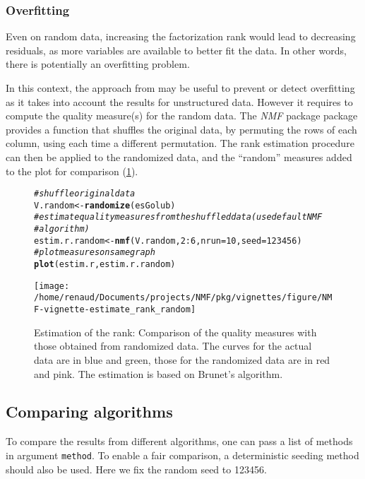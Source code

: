 \documentclass[a4paper]{article}\usepackage[]{graphicx}\usepackage[]{color}
\makeatletter
\def\maxwidth{ %
  \ifdim\Gin@nat@width>\linewidth
    \linewidth
  \else
    \Gin@nat@width
  \fi
}
\newcommand{\hlnum}[1]{\textcolor[rgb]{0.686,0.059,0.569}{#1}}%
\newcommand{\hlcom}[1]{\textcolor[rgb]{0.678,0.584,0.686}{\textit{#1}}}%
\newcommand{\hlopt}[1]{\textcolor[rgb]{0,0,0}{#1}}%
\newcommand{\hlstd}[1]{\textcolor[rgb]{0.345,0.345,0.345}{#1}}%
\newcommand{\hlkwb}[1]{\textcolor[rgb]{0.69,0.353,0.396}{#1}}%
\newcommand{\hlkwc}[1]{\textcolor[rgb]{0.333,0.667,0.333}{#1}}%
\newcommand{\hlkwd}[1]{\textcolor[rgb]{0.737,0.353,0.396}{\textbf{#1}}}%
\newenvironment{kframe}{%
 \def\at@end@of@kframe{}%
 \ifinner\ifhmode%
  \def\at@end@of@kframe{\end{minipage}}%
  \begin{minipage}{\columnwidth}%
 \fi\fi%
 \def\FrameCommand##1{\hskip\@totalleftmargin \hskip-\fboxsep
 \colorbox{shadecolor}{##1}\hskip-\fboxsep
     \hskip-\linewidth \hskip-\@totalleftmargin \hskip\columnwidth}%
 \MakeFramed {\advance\hsize-\width
   \@totalleftmargin\z@ \linewidth\hsize
   \@setminipage}}%
 {\par\unskip\endMakeFramed%
 \at@end@of@kframe}
\newenvironment{knitrout}{}{} %
\let\code=\texttt
\newcommand{\pkgname}[1]{\textit{#1}\xspace}
\newcommand{\Rpkg}[1]{\pkgname{#1} package\xspace}
\newcommand{\nmfpack}{\Rpkg{NMF}}
\renewcommand{\cite}[1]{\parencite{#1}}
\makeatother
\begin{document}
\subsubsection{Overfitting}
Even on random data, increasing the factorization rank would lead to decreasing residuals, as more variables are available to better fit the data.
In other words, there is potentially an overfitting problem. 
 
In this context, the approach from \cite{Frigyesi2008} may be useful to prevent or detect overfitting as it takes into account the results for unstructured data.
However it requires to compute the quality measure(s) for the random data.
The \nmfpack package provides a function that shuffles the original data, by permuting the rows of each column, using each time a different permutation.
The rank estimation procedure can then be applied to the randomized data, and the ``random'' measures added to the plot for comparison (\cref{fig:estim_all_rd}).

\begin{figure}
\begin{knitrout}
\color{fgcolor}\begin{kframe}
\begin{alltt}
\hlcom{# shuffle original data}
\hlstd{V.random} \hlkwb{<-} \hlkwd{randomize}\hlstd{(esGolub)}
\hlcom{# estimate quality measures from the shuffled data (use default NMF}
\hlcom{# algorithm)}
\hlstd{estim.r.random} \hlkwb{<-} \hlkwd{nmf}\hlstd{(V.random,} \hlnum{2}\hlopt{:}\hlnum{6}\hlstd{,} \hlkwc{nrun} \hlstd{=} \hlnum{10}\hlstd{,} \hlkwc{seed} \hlstd{=} \hlnum{123456}\hlstd{)}
\hlcom{# plot measures on same graph}
\hlkwd{plot}\hlstd{(estim.r, estim.r.random)}
\end{alltt}
\end{kframe}
\texttt{[image: /home/renaud/Documents/projects/NMF/pkg/vignettes/figure/NMF-vignette-estimate\_rank\_random]} 

\end{knitrout}

\caption{Estimation of the rank: Comparison of the quality measures with those obtained from randomized data. 
The curves for the actual data are in blue and green, those for the randomized data are in red and pink. 
The estimation is based on Brunet's algorithm.}
\label{fig:estim_all_rd}
\end{figure}

\subsection{Comparing algorithms}
To compare the results from different algorithms, one can pass a list of methods in argument \code{method}. 
To enable a fair comparison, a deterministic seeding method should also be used. 
Here we fix the random seed to 123456. 
\end{document}
